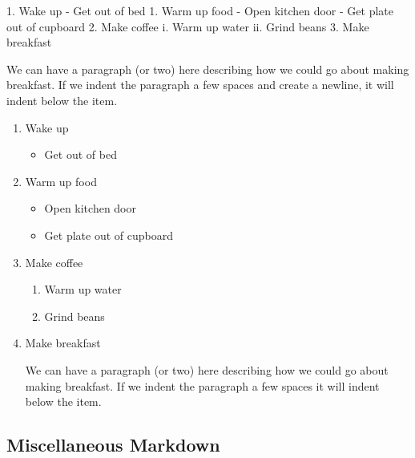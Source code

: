\documentclass[]{tufte-book}
\newenvironment{Shaded}{\begin{snugshade}}{\end{snugshade}}
\newcommand{\NormalTok}[1]{#1}
\newcommand{\SpecialStringTok}[1]{\textcolor[rgb]{0.31,0.60,0.02}{#1}}
\providecommand{\tightlist}{%
  \setlength{\itemsep}{0pt}\setlength{\parskip}{0pt}}
\begin{document}
\begin{Shaded}
\begin{Highlighting}[]
\SpecialStringTok{1. }\NormalTok{Wake up}
\SpecialStringTok{  {-} }\NormalTok{Get out of bed}
\SpecialStringTok{1. }\NormalTok{Warm up food}
\SpecialStringTok{  {-} }\NormalTok{Open kitchen door}
\SpecialStringTok{  {-} }\NormalTok{Get plate out of cupboard}
\SpecialStringTok{2. }\NormalTok{Make coffee}
\NormalTok{  i. Warm up water}
\NormalTok{  ii. Grind beans}
\SpecialStringTok{3. }\NormalTok{Make breakfast}

\NormalTok{  We can have a paragraph (or two) here describing how we could go about making}
\NormalTok{  breakfast. If we indent the paragraph a few spaces and create a newline, it}
\NormalTok{  will indent below the item.}
\end{Highlighting}
\end{Shaded}

\begin{enumerate}
\def\labelenumi{\arabic{enumi}.}
\item
  Wake up

  \begin{itemize}
  \tightlist
  \item
    Get out of bed
  \end{itemize}
\item
  Warm up food

  \begin{itemize}
  \tightlist
  \item
    Open kitchen door
  \item
    Get plate out of cupboard
  \end{itemize}
\item
  Make coffee

  \begin{enumerate}
  \def\labelenumii{\roman{enumii}.}
  \tightlist
  \item
    Warm up water
  \item
    Grind beans
  \end{enumerate}
\item
  Make breakfast

  We can have a paragraph (or two) here describing how we could go about making breakfast. If we indent the paragraph a few spaces it will indent below the item.
\end{enumerate}

\subsection{Miscellaneous Markdown}\label{miscellaneous-markdown}
\end{document}
